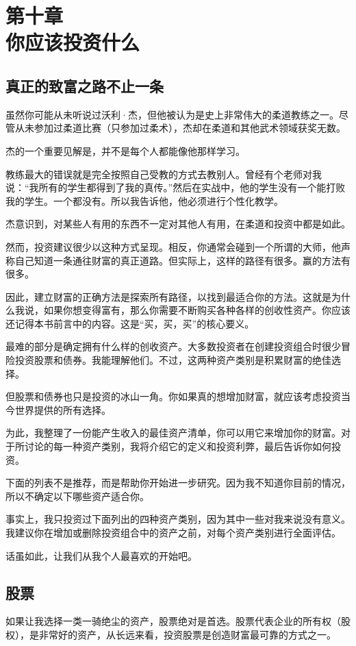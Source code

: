 \section[第十章\q 你应该投资什么]{第十章\\ 你应该投资什么}
\renewcommand{\bookchapter}{10}
\setcounter{figure}{0}
\setcounter{table}{0}
\subsection{真正的致富之路不止一条}
虽然你可能从未听说过沃利·杰，但他被认为是史上非常伟大的柔道教练之一。尽管从未参加过柔道比赛（只参加过柔术），杰却在柔道和其他武术领域获奖无数。

杰的一个重要见解是，并不是每个人都能像他那样学习。

教练最大的错误就是完全按照自己受教的方式去教别人。曾经有个老师对我说：“我所有的学生都得到了我的真传。”然后在实战中，他的学生没有一个能打败我的学生。一个都没有。所以我告诉他，他必须进行个性化教学。

杰意识到，对某些人有用的东西不一定对其他人有用，在柔道和投资中都是如此。

然而，投资建议很少以这种方式呈现。相反，你通常会碰到一个所谓的大师，他声称自己知道一条通往财富的真正道路。但实际上，这样的路径有很多。赢的方法有很多。

因此，建立财富的正确方法是探索所有路径，以找到最适合你的方法。这就是为什么我说，如果你想变得富有，那么你需要不断购买各种各样的创收性资产。你应该还记得本书前言中的内容。这是“买，买，买”的核心要义。

最难的部分是确定拥有什么样的创收资产。大多数投资者在创建投资组合时很少冒险投资股票和债券。我能理解他们。不过，这两种资产类别是积累财富的绝佳选择。

但股票和债券也只是投资的冰山一角。你如果真的想增加财富，就应该考虑投资当今世界提供的所有选择。

为此，我整理了一份能产生收入的最佳资产清单，你可以用它来增加你的财富。对于所讨论的每一种资产类别，我将介绍它的定义和投资利弊，最后告诉你如何投资。

下面的列表不是推荐，而是帮助你开始进一步研究。因为我不知道你目前的情况，所以不确定以下哪些资产适合你。

事实上，我只投资过下面列出的四种资产类别，因为其中一些对我来说没有意义。我建议你在增加或删除投资组合中的资产之前，对每个资产类别进行全面评估。

话虽如此，让我们从我个人最喜欢的开始吧。

\subsection{股票}
如果让我选择一类一骑绝尘的资产，股票绝对是首选。股票代表企业的所有权（股权），是非常好的资产，从长远来看，投资股票是创造财富最可靠的方式之一。

